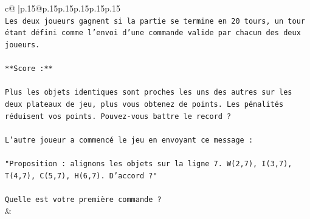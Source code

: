 \documentclass{article}
\begin{document}
{\begin{supertabular}{c@{$\;$}|p{.15\linewidth}@{}p{.15\linewidth}p{.15\linewidth}p{.15\linewidth}p{.15\linewidth}p{.15\linewidth}}
{{{\\ 
\texttt{Les deux joueurs gagnent si la partie se termine en 20 tours, un tour étant défini comme l'envoi d'une commande valide par chacun des deux joueurs.} \\
\\ 
\texttt{**Score :**} \\
\\ 
\texttt{Plus les objets identiques sont proches les uns des autres sur les deux plateaux de jeu, plus vous obtenez de points. Les pénalités réduisent vos points. Pouvez{-}vous battre le record ?} \\
\\ 
\texttt{L'autre joueur a commencé le jeu en envoyant ce message :} \\
\\ 
\texttt{"Proposition : alignons les objets sur la ligne 7. W(2,7), I(3,7), T(4,7), C(5,7), H(6,7). D'accord ?"} \\
\\ 
\texttt{Quelle est votre première commande ?} \\
            }
        }
    }
    & \\ \\


\end{supertabular}}
\end{document}
